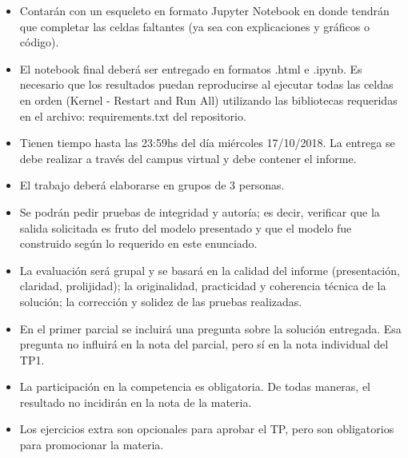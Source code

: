 \documentclass[11pt]{article}
\providecommand{\tightlist}{%
      \setlength{\itemsep}{0pt}\setlength{\parskip}{0pt}}
\begin{document}
\begin{itemize}
\tightlist
\item
  Contarán con un esqueleto en formato Jupyter Notebook en donde tendrán
  que completar las celdas faltantes (ya sea con explicaciones y
  gráficos o código).
\item
  El notebook final deberá ser entregado en formatos .html e .ipynb. Es
  necesario que los resultados puedan reproducirse al ejecutar todas las
  celdas en orden (Kernel - Restart and Run All) utilizando las
  bibliotecas requeridas en el archivo: requirements.txt del
  repositorio.
\item
  Tienen tiempo hasta las 23:59hs del día miércoles 17/10/2018. La
  entrega se debe realizar a través del campus virtual y debe contener
  el informe.
\item
  El trabajo deberá elaborarse en grupos de 3 personas.
\item
  Se podrán pedir pruebas de integridad y autoría; es decir, verificar
  que la salida solicitada es fruto del modelo presentado y que el
  modelo fue construido según lo requerido en este enunciado.
\item
  La evaluación será grupal y se basará en la calidad del informe
  (presentación, claridad, prolijidad); la originalidad, practicidad y
  coherencia técnica de la solución; la corrección y solidez de las
  pruebas realizadas.
\item
  En el primer parcial se incluirá una pregunta sobre la solución
  entregada. Esa pregunta no influirá en la nota del parcial, pero sí en
  la nota individual del TP1.
\item
  La participación en la competencia es obligatoria. De todas maneras,
  el resultado no incidirán en la nota de la materia.
\item
  Los ejercicios extra son opcionales para aprobar el TP, pero son
  obligatorios para promocionar la materia.
\end{itemize}
\end{document}
